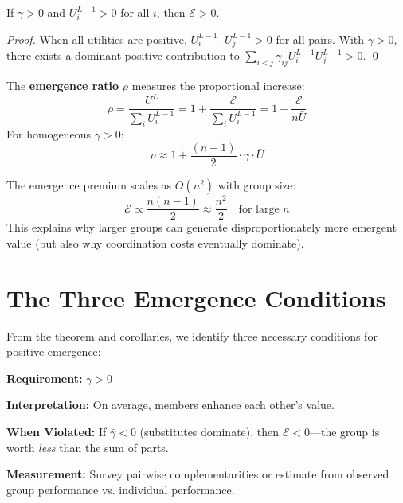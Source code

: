 \begin{corollary}
\label{cor:sufficient}
If $\bar{\gamma} > 0$ and $U^{L-1}_i > 0$ for all $i$, then $\mathcal{E} > 0$.
\end{corollary}

\begin{proof}
When all utilities are positive, $U^{L-1}_i \cdot U^{L-1}_j > 0$ for all pairs.
With $\bar{\gamma} > 0$, there exists a dominant positive contribution to
$\sum_{i<j} \gamma_{ij} U^{L-1}_i U^{L-1}_j > 0$. \qed
\end{proof}

\begin{corollary}
\label{cor:ratio}
The \textbf{emergence ratio} $\rho$ measures the proportional increase:
\begin{equation}
\rho = \frac{U^L}{\sum_i U^{L-1}_i} = 1 + \frac{\mathcal{E}}{\sum_i U^{L-1}_i} = 1 + \frac{\mathcal{E}}{n \bar{U}}
\label{eq:emergence-ratio}
\end{equation}
For homogeneous $\gamma > 0$:
\begin{equation}
\rho \approx 1 + \frac{(n-1)}{2} \cdot \gamma \cdot \bar{U}
\end{equation}
\end{corollary}

\begin{corollary}
\label{cor:scaling}
The emergence premium scales as $O(n^2)$ with group size:
\begin{equation}
\mathcal{E} \propto \frac{n(n-1)}{2} \approx \frac{n^2}{2} \quad \text{for large } n
\end{equation}
This explains why larger groups can generate disproportionately more emergent value
(but also why coordination costs eventually dominate).
\end{corollary}


\section{The Three Emergence Conditions}
\label{sec:let-conditions}

From the theorem and corollaries, we identify three necessary conditions for
positive emergence:

\begin{tcolorbox}[colback=gray!5!white, colframe=gray!75!black,
    title=LET Condition 1: Positive Average Complementarity]

\textbf{Requirement:} $\bar{\gamma} > 0$

\textbf{Interpretation:} On average, members enhance each other's value.

\textbf{When Violated:} If $\bar{\gamma} < 0$ (substitutes dominate), then
$\mathcal{E} < 0$---the group is worth \textit{less} than the sum of parts.

\textbf{Measurement:} Survey pairwise complementarities or estimate from
observed group performance vs. individual performance.
\end{tcolorbox}

